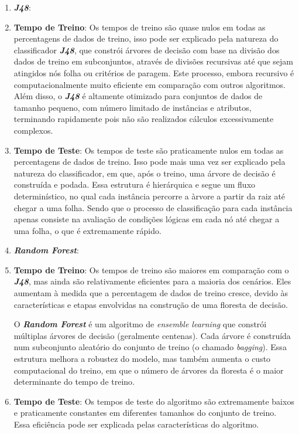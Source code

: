 \documentclass{easychair}
\begin{document}
\begin{enumerate}
	\item \textbf{\textit{J48}}: 
		\item[\textbullet] \textbf{Tempo de Treino}: Os tempos de treino são quase nulos em todas as percentagens de dados de treino, isso pode ser explicado pela natureza do classificador \textbf{\textit{J48}}, que constrói árvores de decisão com base na divisão dos dados de treino em subconjuntos, através de divisões recursivas até que sejam atingidos nós folha ou critérios de paragem. Este processo, embora recursivo é computacionalmente muito eficiente em comparação com outros algoritmos. Além disso, o \textit{\textbf{J48}} é altamente otimizado para conjuntos de dados de tamanho pequeno, com número limitado de instâncias e atributos, terminando rapidamente pois não são realizados cálculos excessivamente complexos.
		\item[\textbullet] \textbf{Tempo de Teste}: Os tempos de teste são praticamente nulos em todas as percentagens de dados de treino. Isso pode mais uma vez ser explicado pela natureza do classificador, em que, após o treino, uma árvore de decisão é construída e podada. Essa estrutura é hierárquica e segue um fluxo determinístico, no qual cada instância percorre a àrvore a partir da raiz até chegar a uma folha. Sendo que o processo de classificação para cada instância apenas consiste na avaliação de condições lógicas em cada nó até chegar a uma folha, o que é extremamente rápido.
	\item \textbf{\textit{Random Forest}}:
		\item[\textbullet] \textbf{Tempo de Treino}: Os tempos de treino são maiores em comparação com o \textit{\textbf{J48}}, mas ainda são relativamente eficientes para a maioria dos cenários. Eles aumentam à medida que a percentagem de dados de treino cresce, devido às características e etapas envolvidas na construção de uma floresta de decisão.

O \textbf{\textit{Random Forest}} é um algoritmo de \textit{ensemble learning} que constrói múltiplas árvores de decisão (geralmente centenas). Cada árvore é construída num subconjunto aleatório do conjunto de treino (o chamado \textit{bagging}). Essa estrutura melhora a robustez do modelo, mas também aumenta o custo computacional do treino, em que o número de árvores da floresta é o maior determinante do tempo de treino. 
		\item[\textbullet] \textbf{Tempo de Teste}: Os tempos de teste do algoritmo são extremamente baixos e praticamente constantes em diferentes tamanhos do conjunto de treino. Essa eficiência pode ser explicada pelas características do algoritmo.


\end{enumerate}
\end{document}
